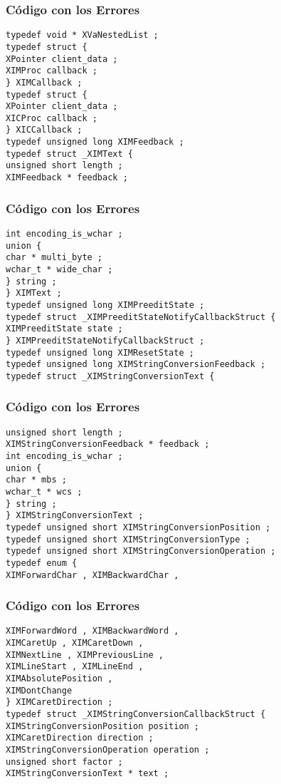 \documentclass{beamer}
\begin{document}
\begin{frame}[fragile]
\frametitle{C\'odigo con los Errores}
\begin{verbatim}
typedef void * XVaNestedList ; 
typedef struct { 
XPointer client_data ; 
XIMProc callback ; 
} XIMCallback ; 
typedef struct { 
XPointer client_data ; 
XICProc callback ; 
} XICCallback ; 
typedef unsigned long XIMFeedback ; 
typedef struct _XIMText { 
unsigned short length ; 
XIMFeedback * feedback ; 
\end{verbatim}
\end{frame}
\begin{frame}[fragile]
\frametitle{C\'odigo con los Errores}
\begin{verbatim}
int encoding_is_wchar ; 
union { 
char * multi_byte ; 
wchar_t * wide_char ; 
} string ; 
} XIMText ; 
typedef unsigned long XIMPreeditState ; 
typedef struct _XIMPreeditStateNotifyCallbackStruct { 
XIMPreeditState state ; 
} XIMPreeditStateNotifyCallbackStruct ; 
typedef unsigned long XIMResetState ; 
typedef unsigned long XIMStringConversionFeedback ; 
typedef struct _XIMStringConversionText { 
\end{verbatim}
\end{frame}
\begin{frame}[fragile]
\frametitle{C\'odigo con los Errores}
\begin{verbatim}
unsigned short length ; 
XIMStringConversionFeedback * feedback ; 
int encoding_is_wchar ; 
union { 
char * mbs ; 
wchar_t * wcs ; 
} string ; 
} XIMStringConversionText ; 
typedef unsigned short XIMStringConversionPosition ; 
typedef unsigned short XIMStringConversionType ; 
typedef unsigned short XIMStringConversionOperation ; 
typedef enum { 
XIMForwardChar , XIMBackwardChar , 
\end{verbatim}
\end{frame}
\begin{frame}[fragile]
\frametitle{C\'odigo con los Errores}
\begin{verbatim}
XIMForwardWord , XIMBackwardWord , 
XIMCaretUp , XIMCaretDown , 
XIMNextLine , XIMPreviousLine , 
XIMLineStart , XIMLineEnd , 
XIMAbsolutePosition , 
XIMDontChange 
} XIMCaretDirection ; 
typedef struct _XIMStringConversionCallbackStruct { 
XIMStringConversionPosition position ; 
XIMCaretDirection direction ; 
XIMStringConversionOperation operation ; 
unsigned short factor ; 
XIMStringConversionText * text ; 
\end{verbatim}
\end{frame}
\end{document}
